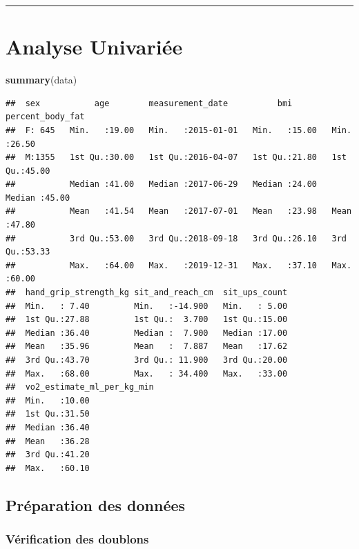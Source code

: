\documentclass[
]{article}
\newenvironment{Shaded}{\begin{snugshade}}{\end{snugshade}}
\newcommand{\FunctionTok}[1]{\textcolor[rgb]{0.13,0.29,0.53}{\textbf{#1}}}
\newcommand{\NormalTok}[1]{#1}
\begin{document}
\begin{center}\rule{0.5\linewidth}{0.5pt}\end{center}

\section{Analyse Univariée}\label{analyse-univariuxe9e}

\begin{Shaded}
\begin{Highlighting}[]
\FunctionTok{summary}\NormalTok{(data)}
\end{Highlighting}
\end{Shaded}

\begin{verbatim}
##  sex           age        measurement_date          bmi        percent_body_fat
##  F: 645   Min.   :19.00   Min.   :2015-01-01   Min.   :15.00   Min.   :26.50   
##  M:1355   1st Qu.:30.00   1st Qu.:2016-04-07   1st Qu.:21.80   1st Qu.:45.00   
##           Median :41.00   Median :2017-06-29   Median :24.00   Median :45.00   
##           Mean   :41.54   Mean   :2017-07-01   Mean   :23.98   Mean   :47.80   
##           3rd Qu.:53.00   3rd Qu.:2018-09-18   3rd Qu.:26.10   3rd Qu.:53.33   
##           Max.   :64.00   Max.   :2019-12-31   Max.   :37.10   Max.   :60.00   
##  hand_grip_strength_kg sit_and_reach_cm  sit_ups_count  
##  Min.   : 7.40         Min.   :-14.900   Min.   : 5.00  
##  1st Qu.:27.88         1st Qu.:  3.700   1st Qu.:15.00  
##  Median :36.40         Median :  7.900   Median :17.00  
##  Mean   :35.96         Mean   :  7.887   Mean   :17.62  
##  3rd Qu.:43.70         3rd Qu.: 11.900   3rd Qu.:20.00  
##  Max.   :68.00         Max.   : 34.400   Max.   :33.00  
##  vo2_estimate_ml_per_kg_min
##  Min.   :10.00             
##  1st Qu.:31.50             
##  Median :36.40             
##  Mean   :36.28             
##  3rd Qu.:41.20             
##  Max.   :60.10
\end{verbatim}

\subsection{Préparation des
données}\label{pruxe9paration-des-donnuxe9es}

\subsubsection{Vérification des
doublons}\label{vuxe9rification-des-doublons}
\end{document}
